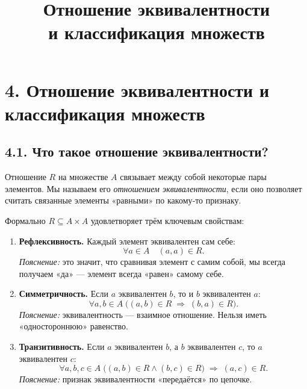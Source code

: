 \documentclass{article}
\begin{document}
\title{Отношение эквивалентности\\и классификация множеств}
\author{}
\date{}
\makeatletter
\renewcommand{\maketitle}{
  \begin{center}
    {\Large\mdseries\@title\par}
    \vspace{0.5em}
  \end{center}
}
\makeatother
\maketitle

\section*{4. Отношение эквивалентности и классификация множеств}

\subsection*{4.1. Что такое отношение эквивалентности?}

Отношение $R$ на множестве $A$ связывает между собой некоторые пары элементов.  
Мы называем его \emph{отношением эквивалентности}, если оно позволяет считать связанные элементы «равными» по какому‑то признаку.  

Формально $R\subseteq A\times A$ удовлетворяет трём ключевым свойствам:

\begin{enumerate}[label=\arabic*)]
  \item \textbf{Рефлексивность.}  
    Каждый элемент эквивалентен сам себе:
    \[
      \forall a\in A\quad (a,a)\in R.
    \]
    \emph{Пояснение:} это значит, что сравнивая элемент с самим собой, мы всегда получаем «да» — элемент всегда «равен» самому себе.

  \item \textbf{Симметричность.}  
    Если $a$ эквивалентен $b$, то и $b$ эквивалентен $a$:
    \[
      \forall a,b\in A\;\bigl((a,b)\in R \;\Rightarrow\; (b,a)\in R\bigr).
    \]
    \emph{Пояснение:} эквивалентность — взаимное отношение. Нельзя иметь «одностороннюю» равенство.

  \item \textbf{Транзитивность.}  
    Если $a$ эквивалентен $b$, а $b$ эквивалентен $c$, то $a$ эквивалентен $c$:
    \[
      \forall a,b,c\in A\;\bigl((a,b)\in R \wedge (b,c)\in R\bigr) \;\Rightarrow\; (a,c)\in R.
    \]
    \emph{Пояснение:} признак эквивалентности «передаётся» по цепочке.
\end{enumerate}
\end{document}
